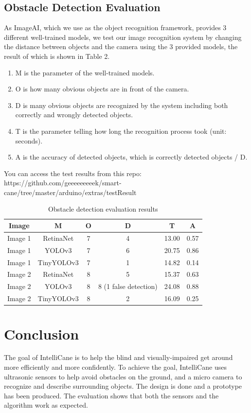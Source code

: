 \subsection{Obstacle Detection Evaluation}
As ImageAI, which we use as the object recognition framework, provides 3 different well-trained models, we test our image recognition system by changing the distance between objects and the camera using the 3 provided models, the result of which is shown in Table 2.
\begin{enumerate}
  \item M is the parameter of the well-trained models.
  \item O is how many obvious objects are in front of the camera.
  \item D is many obvious objects are recognized by the system including both correctly and wrongly detected objects.
  \item T is the parameter telling how long the recognition process took (unit: seconds).
  \item A is the accuracy of detected objects, which is correctly detected objects / D.
\end{enumerate}

You can access the test results from this repo:
https://github.com/geeeeeeeeek/smart-cane/tree/master/arduino/extras/testResult 


\begin{table}
  \caption{Obstacle detection evaluation results}
  \label{tab:freq}
  \begin{tabular}{cccccc}
    \toprule
    Image & M & O & D & T & A \\
    \midrule
    Image 1 & RetinaNet & 7 & 4 & 13.00 & 0.57  \\
    Image 1 & YOLOv3 & 7 & 6 & 20.75 & 0.86  \\
    Image 1 & TinyYOLOv3 & 7 & 1 & 14.82 & 0.14  \\
    Image 2 & RetinaNet & 8 & 5 & 15.37 & 0.63  \\
    Image 2 & YOLOv3 & 8 & 8 (1 false detection) & 24.08 & 0.88  \\
    Image 2 & TinyYOLOv3 & 8 & 2 & 16.09 & 0.25  \\
  \bottomrule
\end{tabular}
\end{table}

\section{Conclusion}
The goal of IntelliCane is to help the blind and visually-impaired get around more efficiently and more confidently. To achieve the goal, IntelliCane uses ultrasonic sensors to help avoid obstacles on the ground, and a micro camera to recognize and describe surrounding objects. The design is done and a prototype has been produced. The evaluation shows that both the sensors and the algorithm work as expected.

